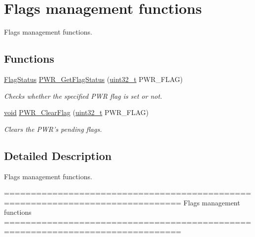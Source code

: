 \hypertarget{group___p_w_r___group7}{\section{Flags management functions}
\label{group___p_w_r___group7}
}


Flags management functions.  


\subsection*{Functions}
\begin{DoxyCompactItemize}
\item 
\hyperlink{group___exported__types_ga89136caac2e14c55151f527ac02daaff}{Flag\-Status} \hyperlink{group___p_w_r___group7_gaa980163a4d83304280ee34942464b4ec}{P\-W\-R\-\_\-\-Get\-Flag\-Status} (\hyperlink{stdint_8h_a435d1572bf3f880d55459d9805097f62}{uint32\-\_\-t} P\-W\-R\-\_\-\-F\-L\-A\-G)
\begin{DoxyCompactList}\small\item\em Checks whether the specified P\-W\-R flag is set or not. \end{DoxyCompactList}\item 
\hyperlink{group___n_a_m_e_ga18028b8badbf1ea7e704ccac3c488e82}{void} \hyperlink{group___p_w_r___group7_ga01c4b2fbd16514b993324e101c3ddf7c}{P\-W\-R\-\_\-\-Clear\-Flag} (\hyperlink{stdint_8h_a435d1572bf3f880d55459d9805097f62}{uint32\-\_\-t} P\-W\-R\-\_\-\-F\-L\-A\-G)
\begin{DoxyCompactList}\small\item\em Clears the P\-W\-R's pending flags. \end{DoxyCompactList}\end{DoxyCompactItemize}


\subsection{Detailed Description}
Flags management functions. \begin{DoxyVerb} ===============================================================================
                           Flags management functions
 ===============================================================================  \end{DoxyVerb}
 


